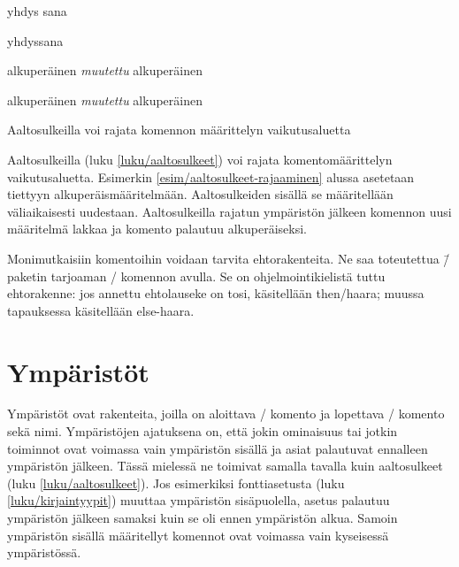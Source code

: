 \begin{koodilohkosis}
\newcommand{\komento}[1]{#1\ignorespaces}
\komento{yhdys}       sana
\end{koodilohkosis}

\begin{tulossis}
  yhdyssana
\end{tulossis}

\begin{esimerkki*}
\begin{koodilohko}
\newcommand{\komento}{alkuperäinen}
\komento
{%
  \renewcommand{\komento}{\textit{muutettu}}
  \komento
}
\komento
\end{koodilohko}
\begin{tulos}
  alkuperäinen \textit{muutettu} alkuperäinen
\end{tulos}
\caption{Aaltosulkeilla voi rajata komennon määrittelyn
  vaikutusaluetta}
\label{esim/aaltosulkeet-rajaaminen}
\end{esimerkki*}

\noindent
Aaltosulkeilla (luku \ref{luku/aaltosulkeet}) voi rajata
komentomäärittelyn vaikutusaluetta. Esimerkin
\ref{esim/aaltosulkeet-rajaaminen} alussa asetetaan 
tiettyyn alkuperäismääritelmään. Aaltosulkeiden sisällä se määritellään
väliaikaisesti uudestaan. Aaltosulkeilla rajatun ympäristön jälkeen
komennon uusi määritelmä lakkaa ja komento palautuu alkuperäiseksi.

Monimutkaisiin komentoihin voidaan tarvita ehtorakenteita. Ne saa
toteutettua \=/ paketin tarjoaman
\-/ komennon avulla. Se on ohjelmointikielistä
tuttu ehtorakenne: jos annettu ehtolauseke on tosi, käsitellään
then\-/haara; muussa tapauksessa käsitellään else-haara.

\section{Ympäristöt}
\label{luku/ympäristöt}

Ympäristöt ovat rakenteita, joilla on aloittava \-/
komento ja lopettava \-/ komento sekä nimi. Ympäristöjen
ajatuksena on, että jokin ominaisuus tai jotkin toiminnot ovat voimassa
vain ympäristön sisällä ja asiat palautuvat ennalleen ympäristön
jälkeen. Tässä mielessä ne toimivat samalla tavalla kuin aaltosulkeet
(luku \ref{luku/aaltosulkeet}). Jos esimerkiksi fonttiasetusta (luku
\ref{luku/kirjaintyypit}) muuttaa ympäristön sisäpuolella, asetus
palautuu ympäristön jälkeen samaksi kuin se oli ennen ympäristön alkua.
Samoin ympäristön sisällä määritellyt komennot ovat voimassa vain
kyseisessä ympäristössä.

